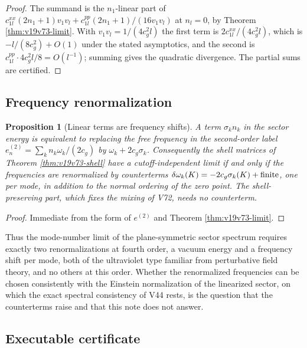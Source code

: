 \documentclass[11pt]{article}
\newtheorem{proposition}[theorem]{Proposition}
\theoremstyle{remark}
\begin{document}
\begin{proof}
The summand is the \(n_1\)-linear part of
\(c^{xx}_{1l}(2n_1+1)v_1v_l+c^{pp}_{1l}(2n_1+1)/(16v_1v_l)\) at
\(n_l=0\), by Theorem \ref{thm:v19v73-limit}.  With
\(v_1v_l=1/(4c_g^2l)\) the first term is \(2c^{xx}_{1l}/(4c_g^2l)\), which
is \(-l/(8c_g^2)+O(1)\) under the stated asymptotics, and the second is
\(c^{pp}_{1l}\cdot4c_g^2l/8=O(l^{-1})\); summing gives the quadratic
divergence.  The partial sums are certified.
\end{proof}

\subsection{Frequency renormalization}

\begin{proposition}[Linear terms are frequency shifts]
\label{prop:v19v74-frequency}
A term \(\sigma_kn_k\) in the sector energy is equivalent to replacing
the free frequency in the second-order label
\(e^{(2)}_n=\sum_kn_k\omega_k/(2c_g)\) by \(\omega_k+2c_g\sigma_k\).
Consequently the shell matrices of Theorem \ref{thm:v19v73-shell} have
a cutoff-independent limit if and only if the frequencies are
renormalized by counterterms \(\delta\omega_k(K)=-2c_g\sigma_k(K)+\hbox{finite}\),
one per mode, in addition to the normal ordering of the zero point.
The shell-preserving part, which fixes the mixing of V72, needs no
counterterm.
\end{proposition}

\begin{proof}
Immediate from the form of \(e^{(2)}\) and Theorem
\ref{thm:v19v73-limit}.
\end{proof}

Thus the mode-number limit of the plane-symmetric sector spectrum
requires exactly two renormalizations at fourth order, a vacuum energy
and a frequency shift per mode, both of the ultraviolet type familiar
from perturbative field theory, and no others at this order.  Whether
the renormalized frequencies can be chosen consistently with the
Einstein normalization of the linearized sector, on which the exact
spectral consistency of V44 rests, is the question that the
counterterms raise and that this note does not answer.

\subsection{Executable certificate}
\end{document}
